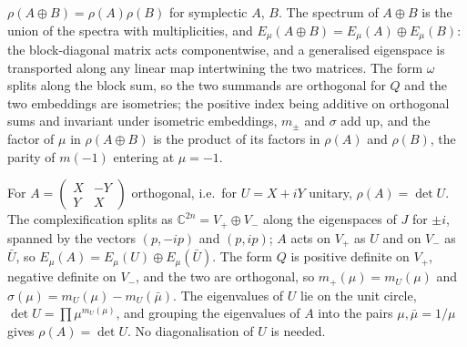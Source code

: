 \begin{proposition}
  \label{prop:rho-blocksum}
  \leanok
  $\rho(A \oplus B) = \rho(A)\rho(B)$ for symplectic $A$, $B$.  The spectrum
  of $A \oplus B$ is the union of the spectra with multiplicities, and
  $E_\mu(A \oplus B) = E_\mu(A) \oplus E_\mu(B)$: the block-diagonal matrix
  acts componentwise, and a generalised eigenspace is transported along any
  linear map intertwining the two matrices.  The form $\omega$ splits along
  the block sum, so the two summands are orthogonal for $Q$ and the two
  embeddings are isometries; the positive index being additive on orthogonal
  sums and invariant under isometric embeddings, $m_\pm$ and $\sigma$ add up,
  and the factor of $\mu$ in $\rho(A \oplus B)$ is the product of its factors
  in $\rho(A)$ and $\rho(B)$, the parity of $m(-1)$ entering at $\mu = -1$.
\end{proposition}

\begin{proposition}
  \label{prop:rho-unitary}
  \leanok
  For $A = \begin{pmatrix} X & -Y \\ Y & X\end{pmatrix}$ orthogonal, i.e.\ for
  $U = X + iY$ unitary, $\rho(A) = \det U$.  The complexification splits as
  $\mathbb{C}^{2n} = V_+ \oplus V_-$ along the eigenspaces of $J$ for $\pm i$,
  spanned by the vectors $(p, -ip)$ and $(p, ip)$; $A$ acts on $V_+$ as $U$
  and on $V_-$ as $\bar U$, so $E_\mu(A) = E_\mu(U) \oplus E_\mu(\bar U)$.
  The form $Q$ is positive definite on $V_+$, negative definite on $V_-$, and
  the two are orthogonal, so $m_+(\mu) = m_U(\mu)$ and
  $\sigma(\mu) = m_U(\mu) - m_U(\bar\mu)$.  The eigenvalues of $U$ lie on the
  unit circle, $\det U = \prod \mu^{m_U(\mu)}$, and grouping the eigenvalues of
  $A$ into the pairs $\mu, \bar\mu = 1/\mu$ gives $\rho(A) = \det U$.  No
  diagonalisation of $U$ is needed.
\end{proposition}

